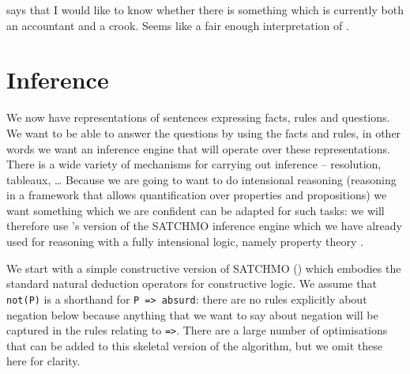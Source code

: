 \documentclass[11pt,a4paper]{article}
\begin{document}
\noindent
{} says that I would like 
to know whether there is something which is currently both an
accountant and a crook. Seems like a fair enough interpretation of
.

\section{Inference}

We now have representations of sentences expressing facts, rules and
questions. We want to be able to answer the questions by using the
facts and rules, in other words we want an inference engine that will
operate over these representations. There is a wide variety of
mechanisms for carrying out inference -- resolution, tableaux, \ldots
Because we are going to want to do intensional reasoning (reasoning in
a framework that allows quantification over properties and
propositions) we want something which we are confident can be adapted
for such tasks: we will therefore use \citet{Ramsay:01b}'s version of the SATCHMO
inference engine \citep{Manthey:88,Loveland:95} which we have already 
  used for reasoning with a fully intensional logic, namely property
  theory \citep{Ramsay:95a,Ramsay:97e,Turner:87}.

We start with a simple constructive version of SATCHMO ()
which embodies
the standard natural deduction operators for constructive logic. We
assume that \texttt{not(P)} is a shorthand for \texttt{P => absurd}:
there are no rules explicitly about negation below because anything
that we want to say about negation will be captured in the rules
relating to \texttt{=>}. There are a large number of optimisations \citep{Loveland:91,Loveland:95,Ramsay:91a}
that can be added to this skeletal version of the algorithm, but we
omit these here for clarity.
\end{document}
